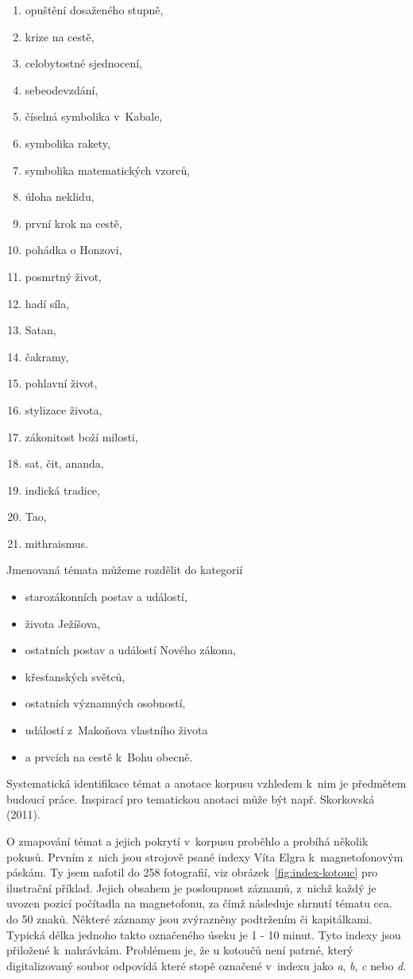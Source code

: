 \begin{enumerate}
\item{opuštění dosaženého stupně,}
\item{krize na cestě,}
\item{celobytostné sjednocení,}
\item{sebeodevzdání,}
\item{číselná symbolika v~Kabale,}
\item{symbolika rakety,}
\item{symbolika matematických vzorců,}
\item{úloha neklidu,}
\item{první krok na cestě,}
\item{pohádka o Honzovi,}
\item{posmrtný život,}
\item{hadí síla,}
\item{Satan,}
\item{čakramy,}
\item{pohlavní život,}
\item{stylizace života,}
\item{zákonitost boží milosti,}
\item{sat, čit, ananda,}
\item{indická tradice,}
\item{Tao,}
\item{mithraismus.}

\end{enumerate}

Jmenovaná témata můžeme rozdělit do kategorií
\begin{itemize}
\item{starozákonních postav a událostí,}
\item{života Ježíšova,}
\item{ostatních postav a událostí Nového zákona,}
\item{křesťanských světců,}
\item{ostatních významných osobností,}
\item{událostí z~Makoňova vlastního života}
\item{a prvcích na cestě k~Bohu obecně.}
\end{itemize}

Systematická
identifikace témat a anotace korpusu vzhledem k~nim je předmětem budoucí práce.
Inspirací pro tematickou anotaci může být např. Skorkovská (2011)\cite{skorkovska2011automatic}.


O zmapování témat a jejich pokrytí v~korpusu proběhlo a probíhá několik pokusů.
Prvním z~nich jsou strojově psané indexy Víta Elgra k~magnetofonovým
páskám. Ty jsem nafotil do 258 fotografií, viz obrázek~\ref{fig:index-kotouc} pro
ilustrační příklad. Jejich obsahem je posloupnost
záznamů, z~nichž každý je uvozen pozicí počítadla na magnetofonu, za čímž
následuje shrnutí tématu cca. do 50 znaků. Některé záznamy jsou zvýrazněny
podtržením či kapitálkami. Typická délka jednoho takto označeného úseku je 1 -
10 minut. Tyto indexy jsou přiložené k~nahrávkám. Problémem je, že u kotoučů
není patrné, který digitalizovaný soubor odpovídá které stopě označené v~indexu
jako {\em a}, {\em b}, {\em c} nebo {\em d}.

